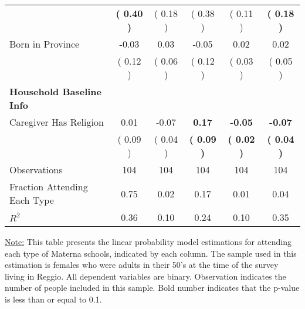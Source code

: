 \begin{table}[H]
{\begin{tabular}{lccccc}
\quad  & \textbf{(     0.40 )} & (     0.18 )  & (     0.38 )  & (     0.11 ) & \textbf{(     0.18 )} \\
\quad Born in Province &     -0.03 &      0.03 &     -0.05 &      0.02 &      0.02 \\
\quad  & (     0.12 ) & (     0.06 )  & (     0.12 )  & (     0.03 ) & (     0.05 ) \\
\midrule
\textbf{Household Baseline Info} \\
\quad Caregiver Has Religion &      0.01 &     -0.07 & \textbf{     0.17} & \textbf{    -0.05} & \textbf{    -0.07} \\
\quad  & (     0.09 ) & (     0.04 )  & \textbf{(     0.09 )}  & \textbf{(     0.02 )} & \textbf{(     0.04 )} \\
\midrule
Observations & 104 & 104 & 104 & 104 & 104 \\
Fraction Attending Each Type &      0.75 &      0.02 &      0.17 &      0.01 &      0.04 \\
\midrule
$ R^2$ &      0.36 &      0.10 &      0.24 &      0.10 &      0.35 \\
\bottomrule
\end{tabular}}
\end{table}
\begin{footnotesize}
\noindent\underline{Note:} This table presents the linear probability model estimations for attending each type of Materna schools, indicated by each column. The sample used in this estimation is females who were adults in their 50's at the time of the survey living in Reggio. All dependent variables are binary. Observation indicates the number of people included in this sample. Bold number indicates that the p-value is less than or equal to 0.1.
\end{footnotesize}
